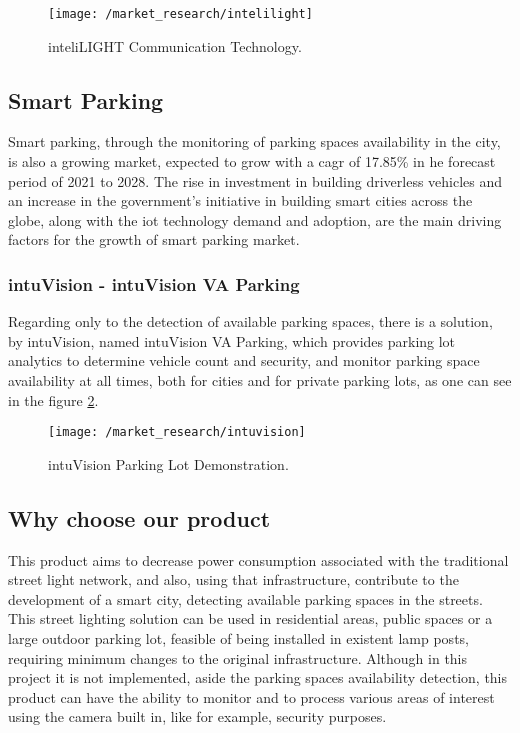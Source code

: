 \begin{figure}[ht]
	\centering
	\texttt{[image: /market\_research/intelilight]}
	\caption{inteliLIGHT Communication Technology.}
	\label{fig:intelilight}
\end{figure}

\subsection{Smart Parking}
Smart parking, through the monitoring of parking spaces availability in the city, is also a growing market, expected to grow with a \ac{cagr} of 17.85\% in he forecast period of 2021 to 2028.\cite{smart_parking_market} The rise in investment in building driverless vehicles and an increase in the government’s initiative in building smart cities across the globe, along with the \ac{iot} technology demand and adoption, are the main driving factors for the growth of smart parking market.

\subsubsection{intuVision - intuVision VA Parking}
Regarding only to the detection of available parking spaces, there is a solution, by intuVision, named intuVision VA Parking, which provides parking lot analytics to determine vehicle count and security, and monitor parking space availability at all times, both for cities and for private parking lots, as one can see in the figure \ref{fig:intuvision}.\cite{parking}

\begin{figure}[ht]
	\centering
	\texttt{[image: /market\_research/intuvision]}
	\caption{intuVision Parking Lot Demonstration.}
	\label{fig:intuvision}
\end{figure}

\subsection{Why choose our product}
This product aims to decrease power consumption associated with the traditional street light network, and also, using that infrastructure, contribute to the development of a smart city, detecting available parking spaces in the streets. This street lighting solution can be used in residential areas, public spaces or a large outdoor parking lot, feasible of being installed in existent lamp posts, requiring minimum changes to the original infrastructure. Although in this project it is not implemented, aside the parking spaces availability detection, this product can have the ability to monitor and to process various areas of interest using the camera built in, like for example, security purposes.
